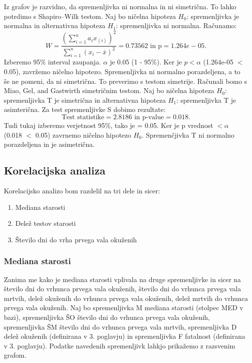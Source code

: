 \documentclass[a4paper,11pt]{article}
\begin{document}
Iz grafov je razvidno, da spremenljivka ni normalna in ni simetrična. To lahko potrdimo s Shapiro–Wilk testom. Naj bo ničelna hipoteza \(H_0\): spremenljivka je normalna in alternativna hipoteza \(H_1\): spremenljivka ni normalna. Računamo:
\[W = \frac{(\sum_{i = 1}^{n}a_i x_{(i)})^2}{\sum_{i = 1}^{n}(x_i - \overset{\_}{x})^2} = 0.73562 \text{ in p} = 1.264e-05. \]
Izberemo 95\% interval zaupanja. \(\alpha\) je 0.05 (1 - 95\%). Ker je \(p < \alpha\) (1.264e-05 \(<\) 0.05), zavržemo ničelno hipotezo. Spremenljivka ni normalno porazdeljena, a to še ne pomeni, da ni simetrična. To preverimo s testom simetrije. Računali bomo s Miao, Gel, and Gastwirth simetričnim testom. Naj bo ničelna hipoteza \(H_0\): spremenljivka T je simetrična in alternativna hipoteza \(H_1\): spremenljivka T je asimterična. Za test spremenljivke S dobimo rezultate:
\[\text{Test statistike} = 2.8186 \text{ in p-value} =  0.018.\]
Tudi tukaj izberemo verjetnost 95\%, tako je \alpha = 0.05. Ker je p vrednost \(< \alpha\) (0.018 \(<\) 0.05) zavrnemo ničelno hipotezo \(H_0\). Spremenčjivka T ni normalno porazdeljena in je asimetrična.

\subsection{Korelacijska analiza}
Korelacijsko analizo bom razdelil na tri dele in sicer:
\begin{enumerate}
\item{Mediana starosti}
\item{Delež testov starosti}
\item{Število dni do vrha prvega vala okuženih}
\end{enumerate}

\subsubsection{Mediana starosti}
Zanima me kako je mediana starosti vplivala na druge spremenljivke in sicer na število dni do vrhunca prvega vala okuženih, število dni do vrhunca prvega vala mrtvih, delež okuženih do vrhunca prvega vala okuženih, delež mrtvih do vrhunca prvega vala okuženih. Naj bo spremenljivka M mediana starosti (stolpec MED v bazi), spremenljivka ŠO število dni do vrhunca prvega vala okuženih, spremenljivka ŠM število dni do vrhunca prvega vala mrtvih, spremenljivka D delež okuženih (definirana v 3. poglavju) in spremenljivka F fatalnost (definirana v 3. poglavju). Podatke navedenih spremenljivk lahkjo prikažemo z razsvenim grafom.
\end{document}

